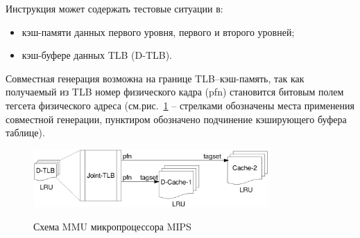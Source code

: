 \documentclass[14pt]{extreport}
\begin{document}
Инструкция может содержать тестовые ситуации в:
\begin{itemize}
  \item кэш-памяти данных первого уровня, первого и второго уровней;
  \item кэш-буфере данных TLB (D-TLB).
\end{itemize}

Совместная генерация возможна на границе TLB--кэш-память, так как
получаемый из TLB номер физического кадра (pfn) становится битовым
полем тегсета физического адреса (см.рис.~\ref{mips_mmu_scheme} --
стрелками обозначены места применения совместной генерации,
пунктиром обозначено подчинение кэширующего буфера таблице).

\begin{figure}[h] \center
  \includegraphics[width=0.8\textwidth]{4.analysis/mips}\\
  \caption{Схема MMU микропроцессора MIPS}\label{mips_mmu_scheme}
\end{figure}
\end{document}
